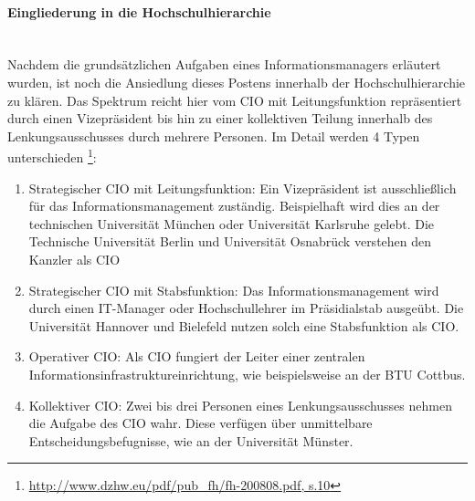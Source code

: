 \paragraph{Eingliederung in die Hochschulhierarchie}\mbox{}\\
Nachdem die grundsätzlichen Aufgaben eines Informationsmanagers erläutert wurden, ist noch die Ansiedlung dieses Postens innerhalb der Hochschulhierarchie zu klären. Das Spektrum reicht hier vom CIO mit Leitungsfunktion repräsentiert durch einen Vizepräsident bis hin zu einer kollektiven Teilung innerhalb des Lenkungsausschusses durch mehrere Personen. Im Detail werden 4 Typen unterschieden \footnote{\url{http://www.dzhw.eu/pdf/pub_fh/fh-200808.pdf, s.10}}:

\begin{enumerate}
    \item Strategischer CIO mit Leitungsfunktion: Ein Vizepräsident ist ausschließlich für das Informationsmanagement zuständig. Beispielhaft wird dies an der technischen Universität München oder Universität Karlsruhe gelebt. Die Technische Universität Berlin und Universität Osnabrück verstehen den Kanzler als CIO
    \item Strategischer CIO mit Stabsfunktion: Das Informationsmanagement wird durch einen IT-Manager oder Hochschullehrer im Präsidialstab ausgeübt. Die Universität Hannover und Bielefeld nutzen solch eine Stabsfunktion als CIO.
    \item Operativer CIO: Als CIO fungiert der Leiter einer zentralen Informationsinfrastruktureinrichtung, wie beispielsweise an der BTU Cottbus.
    \item Kollektiver CIO: Zwei bis drei Personen eines Lenkungsausschusses nehmen die Aufgabe des CIO wahr. Diese verfügen über unmittelbare Entscheidungsbefugnisse, wie an der Universität Münster.
\end{enumerate}


